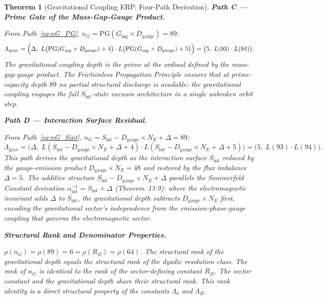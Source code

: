 \documentclass[11pt, letterpaper]{article}
\theoremstyle{definition}
\theoremstyle{plain}
\newtheorem{theorem}{Theorem}[section]
\begin{document}
\begin{theorem}[Gravitational Coupling ERP: Four-Path Derivation]
\medskip
\noindent\textbf{Path C — Prime Gate of the Mass-Gap-Gauge Product.}

From Path~\eqref{eq:nG_PG}, $n_G = \mathrm{PG}(G_\mathrm{mg} \times D_\mathrm{gauge}) = 89$:
\begin{equation}
    \Lambda_\mathrm{grav}
    = \Bigl(\Delta,\; L\bigl(\mathrm{PG}(G_\mathrm{mg} \times D_\mathrm{gauge}) + 4\bigr)
             \cdot L\bigl(\mathrm{PG}(G_\mathrm{mg} \times D_\mathrm{gauge}) + 5\bigr)\Bigr)
    = \bigl(5,\; L(93) \cdot L(94)\bigr).
\end{equation}
The gravitational coupling depth is the prime at the ordinal defined by the mass-gap-gauge
product. The Frictionless Propagation Principle ensures that at prime-capacity depth $89$
no partial structural discharge is available: the gravitational coupling engages the full
$S_\mathrm{int}$-state vacuum architecture in a single unbroken orbit step.

\medskip
\noindent\textbf{Path D — Interaction Surface Residual.}

From Path~\eqref{eq:nG_Sint}, $n_G = S_\mathrm{int} - D_\mathrm{gauge} \times N_E + \Delta = 89$:
\begin{equation}
    \Lambda_\mathrm{grav}
    = \bigl(\Delta,\; L(S_\mathrm{int} - D_\mathrm{gauge} \times N_E + \Delta + 4)
             \cdot L(S_\mathrm{int} - D_\mathrm{gauge} \times N_E + \Delta + 5)\bigr)
    = \bigl(5,\; L(93) \cdot L(94)\bigr).
\end{equation}
This path derives the gravitational depth as the interaction surface $S_\mathrm{int}$
reduced by the gauge-emission product $D_\mathrm{gauge} \times N_E = 48$ and restored
by the flux imbalance $\Delta = 5$. The additive structure $S_\mathrm{int} - D_\mathrm{gauge}
\times N_E + \Delta$ parallels the Sommerfeld Constant derivation $\alpha^{-1}_\mathrm{int}
= S_\mathrm{int} + \Delta$ (Theorem~13.9): where the electromagnetic invariant adds $\Delta$
to $S_\mathrm{int}$, the gravitational depth subtracts $D_\mathrm{gauge} \times N_E$ first,
encoding the gravitational sector's independence from the emission-phase-gauge coupling
that governs the electromagnetic sector.

\medskip
\noindent\textbf{Structural Rank and Denominator Properties.}

$\rho(n_G) = \rho(89) = 6 = \rho(R_D) = \rho(64)$.
The structural rank of the gravitational depth equals the structural rank of the dyadic resolution class. The rank of $n_G$ is identical to the rank of the sector-defining constant $R_D$. The sector constant and the gravitational depth share their structural rank. This rank identity is a direct structural property of the constants $\Lambda_b$ and $\Lambda_H$.


\end{theorem}
\end{document}

